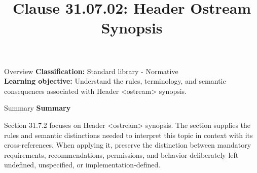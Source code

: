 \documentclass[10pt,letterpaper]{article}
\title{Clause 31.07.02: Header Ostream Synopsis}
\author{}
\date{}
\begin{document}
\maketitle
\begin{CornellOverviewBox}{Overview}
\textbf{Classification:} Standard library - Normative\\[2pt]
\textbf{Learning objective:} Understand the rules, terminology, and semantic consequences associated with Header <ostream> synopsis.
\end{CornellOverviewBox}\begin{CornellSummaryBox}{Summary}
{\sffamily\bfseries\color{Accent} Summary}\par\vspace{3pt}Section 31.7.2 focuses on Header <ostream> synopsis. The section supplies the rules and semantic distinctions needed to interpret this topic in context with its cross-references. When applying it, preserve the distinction between mandatory requirements, recommendations, permissions, and behavior deliberately left undefined, unspecified, or implementation-defined.
\end{CornellSummaryBox}
\end{document}
